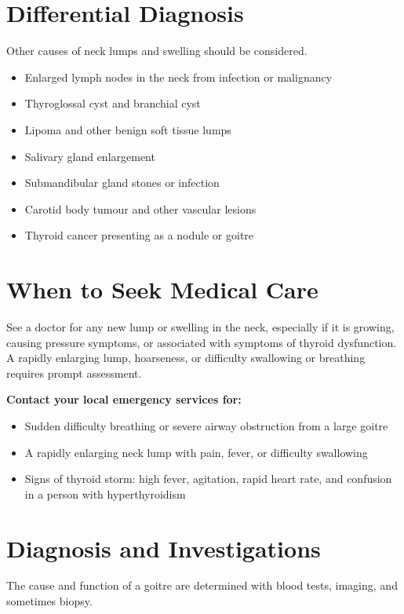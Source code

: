 \section*{Differential Diagnosis}
Other causes of neck lumps and swelling should be considered.

\begin{itemize}
    \item Enlarged lymph nodes in the neck from infection or malignancy
    \item Thyroglossal cyst and branchial cyst
    \item Lipoma and other benign soft tissue lumps
    \item Salivary gland enlargement
    \item Submandibular gland stones or infection
    \item Carotid body tumour and other vascular lesions
    \item Thyroid cancer presenting as a nodule or goitre
\end{itemize}

\section*{When to Seek Medical Care}
See a doctor for any new lump or swelling in the neck, especially if it is growing, causing pressure symptoms, or associated with symptoms of thyroid dysfunction. A rapidly enlarging lump, hoarseness, or difficulty swallowing or breathing requires prompt assessment.

\textbf{Contact your local emergency services for:}
\begin{itemize}
    \item Sudden difficulty breathing or severe airway obstruction from a large goitre
    \item A rapidly enlarging neck lump with pain, fever, or difficulty swallowing
    \item Signs of thyroid storm: high fever, agitation, rapid heart rate, and confusion in a person with hyperthyroidism
\end{itemize}

\section*{Diagnosis and Investigations}
The cause and function of a goitre are determined with blood tests, imaging, and sometimes biopsy.

